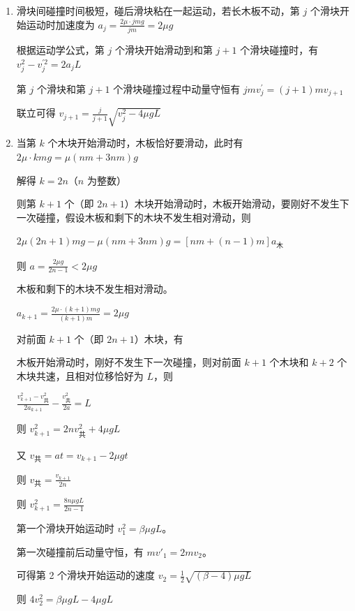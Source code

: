 \documentclass[\gkver]{gaokaozhenti}
\begin{document}
\begin{enumerate}
{\begin{enumerate}
	$-2\mu mgL=\frac{1}{2}m{v'_1}^{2}-\frac{1}{2}mv_{1}^{2}$

	解得 $v'_1 = \sqrt{(\beta - 4)\mu gL}$

	\item
	滑块间碰撞时间极短，碰后滑块粘在一起运动，若长木板不动，第 $j$ 个滑块开始运动时加速度为 $a_{j}=\frac{2\mu\cdot jmg}{jm}=2\mu g$

	根据运动学公式，第 $j$ 个滑块开始滑动到和第 $j+1$ 个滑块碰撞时，有 $v_{j}^{2}-v_{j}^{\prime 2}=2a_{j}L$

	第 $j$ 个滑块和第 $j+1$ 个滑块碰撞过程中动量守恒有 $jmv_{j}^{\prime}=(j+1)mv_{j+1}$

	联立可得 $v_{j+1}=\frac{j}{j+1}\sqrt{v_{j}^{2}-4\mu gL}$

	\item
	当第 $k$ 个木块开始滑动时，木板恰好要滑动，此时有 $2\mu \cdot kmg = \mu(nm + 3nm)g$

	解得 $k = 2n$（$n$ 为整数）

	则第 $k+1$ 个（即 $2n+1$）木块开始滑动时，木板开始滑动，要刚好不发生下一次碰撞，假设木板和剩下的木块不发生相对滑动，则

	$2\mu(2n+1)mg - \mu(nm + 3nm)g = \left[nm + (n-1)m\right]a_\text{木}$

	则 $a=\frac{2\mu g}{2n-1}<2\mu g$

	木板和剩下的木块不发生相对滑动。

	$a_{k+1}=\frac{2\mu\cdot\left(k+1\right)mg}{\left(k+1\right)m}=2\mu g$

	对前面 $k+1$ 个（即 $2n+1$）木块，有

	木板开始滑动时，刚好不发生下一次碰撞，则对前面 $k+1$ 个木块和 $k+2$ 个木块共速，且相对位移恰好为 $L$，则

	$\frac{v_{k+1}^{2}-v_\text{共}^{2}}{2a_{k+1}}-\frac{v_\text{共}^{2}}{2a}=L$

	则 $v_{k+1}^{2} = 2nv_\text{共}^{2} + 4\mu gL$

	又 $v_\text{共} = at = v_{k+1} - 2\mu gt$

	则 $v_\text{共} = \frac{v_{k+1}}{2n}$

	则 $v_{k+1}^{2} = \frac{8n\mu gL}{2n-1}$

	第一个滑块开始运动时 $v_{1}^{2} = \beta\mu gL$。

	第一次碰撞前后动量守恒，有 $mv'_1 = 2mv_{2}$。

	可得第 2 个滑块开始运动的速度 $v_{2} = \frac{1}{2}\sqrt{(\beta - 4)\mu gL}$

	则 $4v_{2}^{2} = \beta\mu gL - 4\mu gL$


\end{enumerate}}
\end{enumerate}
\end{document}
